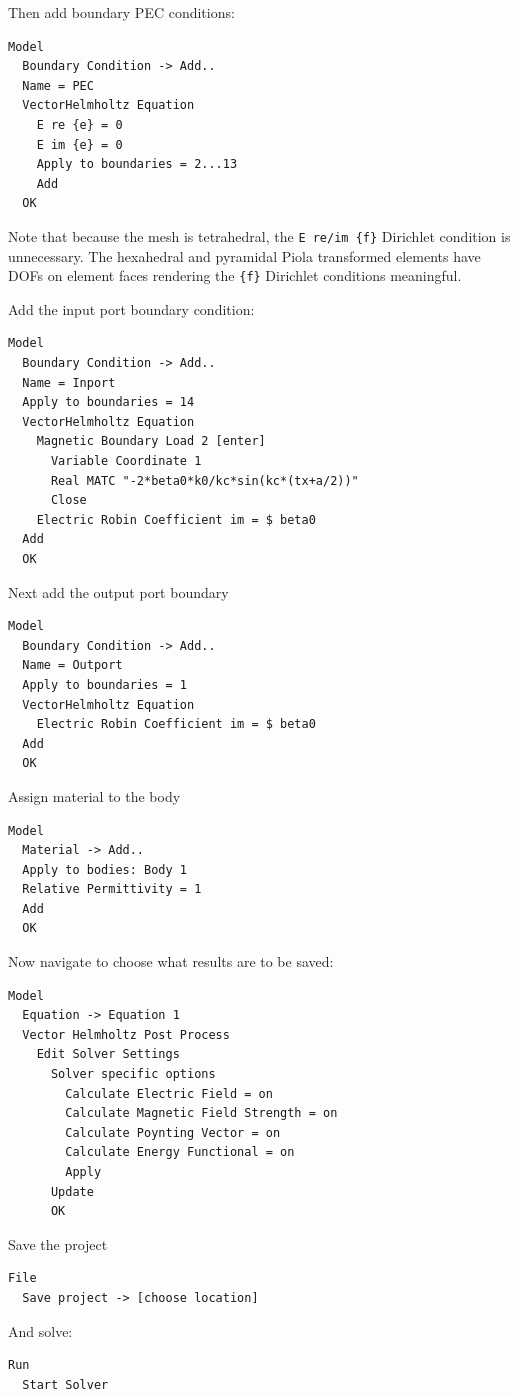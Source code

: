 Then add boundary PEC conditions:
\begin{verbatim}
Model
  Boundary Condition -> Add..
  Name = PEC
  VectorHelmholtz Equation
    E re {e} = 0
    E im {e} = 0
    Apply to boundaries = 2...13
    Add
  OK
\end{verbatim}

Note that because the mesh is tetrahedral, the \texttt{E re/im \{f\}} Dirichlet condition is unnecessary. The hexahedral and pyramidal Piola transformed elements have DOFs on element faces rendering the \texttt{\{f\}} Dirichlet conditions meaningful.

Add the input port boundary condition:
\begin{verbatim}
Model
  Boundary Condition -> Add..
  Name = Inport
  Apply to boundaries = 14
  VectorHelmholtz Equation
    Magnetic Boundary Load 2 [enter]
      Variable Coordinate 1
      Real MATC "-2*beta0*k0/kc*sin(kc*(tx+a/2))"
      Close
    Electric Robin Coefficient im = $ beta0
  Add
  OK
\end{verbatim}

Next add the output port boundary
\begin{verbatim}
Model
  Boundary Condition -> Add..
  Name = Outport
  Apply to boundaries = 1
  VectorHelmholtz Equation
    Electric Robin Coefficient im = $ beta0
  Add
  OK
\end{verbatim}

Assign material to the body
\begin{verbatim}
Model
  Material -> Add..
  Apply to bodies: Body 1
  Relative Permittivity = 1
  Add
  OK
\end{verbatim}

Now navigate to choose what results are to be saved:
\begin{verbatim}
Model
  Equation -> Equation 1
  Vector Helmholtz Post Process
    Edit Solver Settings
      Solver specific options
        Calculate Electric Field = on
        Calculate Magnetic Field Strength = on
        Calculate Poynting Vector = on
        Calculate Energy Functional = on
        Apply
      Update
      OK
\end{verbatim}

Save the project
\begin{verbatim}
File
  Save project -> [choose location]
\end{verbatim}

And solve:
\begin{verbatim}
Run
  Start Solver
\end{verbatim}

